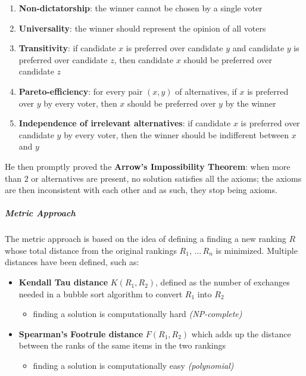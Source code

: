 \documentclass[english]{article}
\begin{document}
\begin{enumerate}[label=axiom \arabic*., leftmargin=*, labelindent=1em, widest*=8]
  \item \textbf{Non-dictatorship}: the winner cannot be chosen by a single voter
  \item \textbf{Universality}: the winner should represent the opinion of all voters
  \item \textbf{Transitivity}: if candidate \(x\) is preferred over candidate \(y\) and candidate \(y\) is preferred over candidate \(z\), then candidate \(x\) should be preferred over candidate \(z\)
  \item \textbf{Pareto-efficiency}: for every pair \(\left( x, y \right)\) of alternatives, if \(x\) is preferred over \(y\) by every voter, then \(x\) should be preferred over \(y\) by the winner
  \item \textbf{Independence of irrelevant alternatives}: if candidate \(x\) is preferred over candidate \(y\) by every voter, then the winner should be indifferent between \(x\) and \(y\)
\end{enumerate}

He then promptly proved the \textbf{Arrow's Impossibility Theorem}: when more than \(2\) or alternatives are present, no solution satisfies all the axioms;
the axioms are then inconsistent with each other and as such, they stop being axioms.

\subparagraph*{Metric Approach}
The metric approach is based on the idea of defining a finding a new ranking \(R\) whose total distance from the original rankings \(R_1, \, \ldots \, R_n\) is minimized.
Multiple distances have been defined, such as:
\begin{itemize}
  \item \textbf{Kendall Tau distance} \(K\left( R_1, R_2 \right)\), defined as the number of exchanges needed in a bubble sort algorithm to convert \(R_1\) into \(R_2\)
        \begin{itemize}[label=\xmarkthin]
          \item finding a solution is computationally hard \textit{(NP-complete)}
        \end{itemize}
  \item \textbf{Spearman's Footrule distance} \(F\left( R_1, R_2 \right)\) which adds up the distance between the ranks of the same items in the two rankings
        \begin{itemize}[label=\cmarkthin]
          \item finding a solution is computationally easy \textit{(polynomial)}
        \end{itemize}
\end{itemize}
\end{document}

